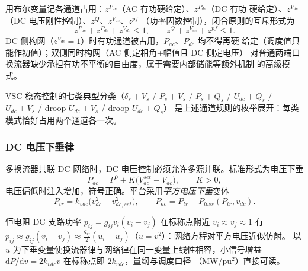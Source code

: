 用布尔变量记各通道占用：$z^{P_{ac}}$（AC 有功硬给定）、$z^{P_{dc}}$（DC 有功
硬给定）、$z^{V_{dc}}$（DC 电压刚性控制）、$z^{Q}$、$z^{V_{ac}}$、$z^{pf}$
（功率因数控制），闭合原则的互斥形式为
\begin{equation}
z^{P_{ac}}+z^{P_{dc}}+z^{V_{dc}}\le1,\qquad
z^{Q}+z^{V_{ac}}+z^{pf}\le1.
\end{equation}
DC 侧构网（$z^{V_{dc}}=1$）时有功通道被占用，$P_{ac}$、$P_{dc}$ 均不得再硬
给定（调度值只能作初值）；双侧同时构网（AC 侧定相角+幅值且 DC 侧定电压）
对普通两端口换流器缺少承担有功不平衡的自由度，属于需要内部储能等额外机制
的高级模式。

VSC 稳态控制的七类典型分类（$\delta_s{+}V_s$ / $P_s{+}V_s$ / $P_s{+}Q_s$ /
$U_{dc}{+}Q_s$ / $U_{dc}{+}V_s$ / droop $U_{dc}{+}V_s$ / droop $U_{dc}{+}Q_s$）
是上述通道规则的枚举展开：每类模式恰好占用两个通道各一次。

\subsubsection{DC 电压下垂律}
多换流器共联 DC 网络时，DC 电压控制必须允许多源并联。标准形式为电压下垂
\begin{equation}
P_{dc}=P^{0}+K\bigl(V_{dc}^{set}-V_{dc}\bigr),\qquad K>0,
\end{equation}
电压偏低时注入增加，符号正确。平台采用\emph{平方电压下垂}变体
\begin{equation}
P_{tr}=k_{vdc}\bigl(v_{dc}^{2}-v_{dc,set}^{2}\bigr),\qquad
P_{ac}=P_{tr}-P_{loss}(P_{tr},v_{dc}).
\end{equation}
\begin{remark}[$v^{2}$ 下垂的动机]
恒电阻 DC 支路功率 $p_{ij}=g_{ij}v_i(v_i-v_j)$ 在标称点附近
$v_i\approx v_j\approx1$ 有 $p_{ij}\approx g_{ij}(v_i-v_j)\approx
\tfrac{g_{ij}}{2}(u_i-u_j)$（$u=v^{2}$）：网络方程对平方电压近似仿射。
以 $u$ 为下垂变量使换流器律与网络律在同一变量上线性相容，小信号增益
$\mathrm{d}P/\mathrm{d}v=2k_{vdc}v$ 在标称点即 $2k_{vdc}$，量纲与调度口径
（MW/pu$^{2}$）直接可读。
\end{remark}

